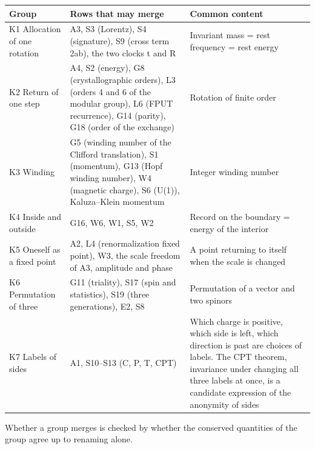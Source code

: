 \documentclass[
  a4paper,
]{article}
\newcounter{none} %
\begin{document}
{\def\LTcaptype{none} %
\begin{longtable}[]{@{}
  >{\raggedright\arraybackslash}p{}
  >{\raggedright\arraybackslash}p{}
  >{\raggedright\arraybackslash}p{}@{}}
\toprule\noalign{}
\begin{minipage}[b]{\linewidth}\raggedright
Group
\end{minipage} & \begin{minipage}[b]{\linewidth}\raggedright
Rows that may merge
\end{minipage} & \begin{minipage}[b]{\linewidth}\raggedright
Common content
\end{minipage} \\
\midrule\noalign{}
\endhead
\bottomrule\noalign{}
\endlastfoot
K1 Allocation of one rotation & A3, S3 (Lorentz), S4 (signature), S9
(cross term 2ab), the two clocks t and R & Invariant mass = rest
frequency = rest energy \\
K2 Return of one step & A4, S2 (energy), G8 (crystallographic orders),
L3 (orders 4 and 6 of the modular group), L6 (FPUT recurrence), G14
(parity), G18 (order of the exchange) & Rotation of finite order \\
K3 Winding & G5 (winding number of the Clifford translation), S1
(momentum), G13 (Hopf winding number), W4 (magnetic charge), S6 (U(1)),
Kaluza--Klein momentum & Integer winding number \\
K4 Inside and outside & G16, W6, W1, S5, W2 & Record on the boundary =
energy of the interior \\
K5 Oneself as a fixed point & A2, L4 (renormalization fixed point), W3,
the scale freedom of A3, amplitude and phase & A point returning to
itself when the scale is changed \\
K6 Permutation of three & G11 (triality), S17 (spin and statistics), S19
(three generations), E2, S8 & Permutation of a vector and two spinors \\
K7 Labels of sides & A1, S10--S13 (C, P, T, CPT) & Which charge is
positive, which side is left, which direction is past are choices of
labels. The CPT theorem, invariance under changing all three labels at
once, is a candidate expression of the anonymity of sides \\
\end{longtable}
}

Whether a group merges is checked by whether the conserved quantities of
the group agree up to renaming alone.
\end{document}
